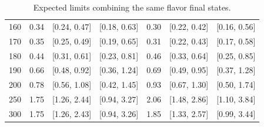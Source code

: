 \begin{table}[!ht]
\begin{center}
\begin{tabular} {|c|ccc||ccc|}
160 & 0.34 & [0.24, 0.47] & [0.18, 0.63]  & 0.30 & [0.22, 0.42] & [0.16, 0.56] \\ 
170 & 0.35 & [0.25, 0.49] & [0.19, 0.65]  & 0.31 & [0.22, 0.43] & [0.17, 0.58] \\ 
180 & 0.44 & [0.31, 0.61] & [0.23, 0.81]  & 0.46 & [0.33, 0.64] & [0.25, 0.85] \\ 
190 & 0.66 & [0.48, 0.92] & [0.36, 1.24]  & 0.69 & [0.49, 0.95] & [0.37, 1.28] \\ 
200 & 0.78 & [0.56, 1.08] & [0.42, 1.45]  & 0.93 & [0.67, 1.30] & [0.50, 1.74] \\ 
250 & 1.75 & [1.26, 2.44] & [0.94, 3.27]  & 2.06 & [1.48, 2.86] & [1.10, 3.84] \\ 
300 & 1.75 & [1.26, 2.43] & [0.94, 3.26]  & 1.85 & [1.33, 2.57] & [0.99, 3.44] \\ 
\hline
\end{tabular}
\caption{Expected limits combining the same flavor final states.}
\label{tab:sf_limits}
\end{center}
\end{table}


